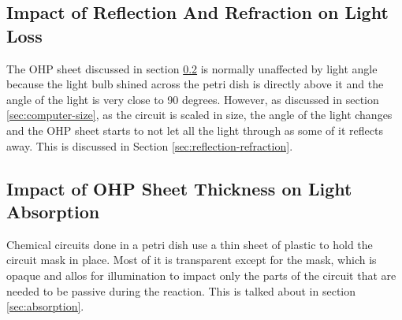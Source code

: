 \subsection{Impact of Reflection And Refraction on Light Loss}
The OHP sheet discussed in section \ref{sec:ohp-impact} is normally unaffected by light angle because the light bulb shined across the petri dish is directly above it and the angle of the light is very close to 90 degrees.
However, as discussed in section \ref{sec:computer-size}, as the circuit is scaled in size, the angle of the light changes and the OHP sheet starts to not let all the light through as some of it reflects away.
This is discussed in Section \ref{sec:reflection-refraction}.

\subsection{Impact of OHP Sheet Thickness on Light Absorption} \label{sec:ohp-impact}
Chemical circuits done in a petri dish use a thin sheet of plastic to hold the circuit mask in place. Most of it is transparent except for the mask, 
which is opaque and allos for illumination to impact only the parts of the circuit that are needed to be passive during the reaction.
This is talked about in section \ref{sec:absorption}.
